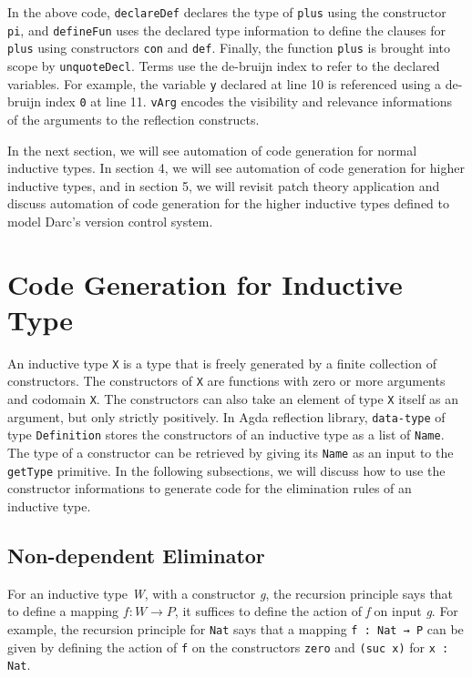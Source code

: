 \documentclass[sigplan,10pt]{acmart}
\begin{document}
In the above code, {\tt declareDef} declares the type of {\tt plus} using the constructor {\tt pi}, and {\tt defineFun} uses the declared type information to define the clauses for {\tt plus} using constructors {\tt con} and {\tt def}. Finally, the function {\tt plus} is brought into scope by {\tt unquoteDecl}. Terms use the de-bruijn index to refer to the declared variables. For example, the variable {\tt y} declared at line 10 is referenced using a de-bruijn index {\tt 0} at line 11. {\tt vArg} encodes the visibility and relevance informations of the arguments to the reflection constructs.

In the next section, we will see automation of code generation for normal inductive types. In section 4, we will see automation of code generation for higher inductive types, and in section 5, we will revisit patch theory \citep{Angiuli-2014} application and discuss automation of code generation for the higher inductive types defined to model Darc's version control system.

\section{Code Generation for Inductive Type}
\label{sec:sec3}
An inductive type {\tt X} is a type that is freely generated by a finite collection of constructors. The constructors of {\tt X} are functions with zero or more arguments and codomain {\tt X}. The constructors can also take an element of type {\tt X} itself as an argument, but only strictly positively. In Agda reflection library, {\tt data-type} of type {\tt Definition} stores the constructors of an inductive type as a list of {\tt Name}. The type of a constructor can be retrieved by giving its {\tt Name} as an input to the {\tt getType} primitive. In the following subsections, we will discuss how to use the constructor informations to generate code for the elimination rules of an inductive type. 

\subsection{Non-dependent Eliminator}
\label{sec:sec3.1}

For an inductive type \emph{W}, with a constructor \emph{g}, the recursion principle says that to define a mapping $f : W \rightarrow P$, it suffices to define the action of \emph{f} on input \emph{g}. For example, the recursion principle for {\tt Nat} says that a mapping {\tt f : Nat → P} can be given by defining the action of {\tt f} on the constructors {\tt zero} and {\tt (suc x)} for {\tt x : Nat}. 
\end{document}
